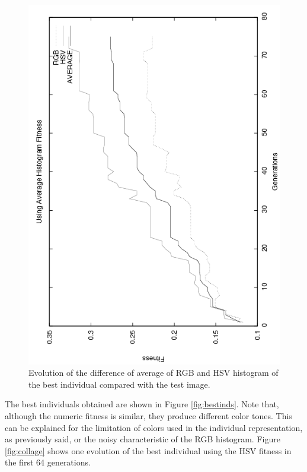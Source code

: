 {\begin{figure}
   \includegraphics[angle=-90,scale =0.40] {gfx/art/averagegens.png}
\caption{Evolution of the difference of average of RGB and HSV histogram of the best individual compared with the test image. }
\label{fig:averagegens}
\end{figure}

The best individuals obtained are shown in Figure
\ref{fig:bestinds}. Note that, although the numeric fitness is
similar, they produce different color tones. This can be explained for
the limitation of colors used in the individual representation, as
previously said, or the noisy characteristic of the RGB
histogram. Figure \ref{fig:collage} shows one evolution of the best
individual using the HSV fitness in the first 64 generations. %

}
